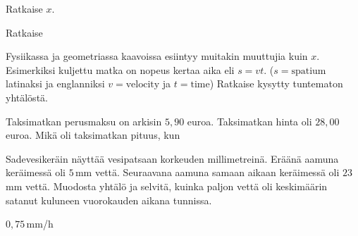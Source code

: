 \begin{tehtavasivu}
\begin{tehtava}
Ratkaise $x$.
	\begin{vastaus}
	\end{vastaus}
\end{tehtava}

\begin{tehtava}
Ratkaise
	\begin{vastaus}
	\end{vastaus}
\end{tehtava}

\begin{tehtava}
Fysiikassa ja geometriassa kaavoissa esiintyy muitakin muuttujia kuin $x$. Esimerkiksi kuljettu matka on nopeus kertaa aika eli $s=vt$. ($s= \text{spatium}$ latinaksi ja englanniksi $v= \text{velocity}$ ja $t= \text{time}$) Ratkaise kysytty tuntematon yhtälöstä.

	\begin{vastaus}
	\end{vastaus}
\end{tehtava}

\begin{tehtava}
Taksimatkan perusmaksu on arkisin $5,90$ euroa. Taksimatkan hinta oli $28,00$ euroa. Mikä oli taksimatkan pituus, kun
	\begin{vastaus}
		\alakohdat{
			§ $14,5$ kilometriä
			§ $10,4$ kilometriä
		}
	\end{vastaus}
\end{tehtava}

\begin{tehtava}
Sadevesikeräin näyttää vesipatsaan korkeuden millimetreinä. Eräänä aamuna keräimessä oli $5$\,mm vettä. Seuraavana aamuna samaan aikaan keräimessä oli $23$\,mm vettä. Muodosta yhtälö ja selvitä, kuinka paljon vettä oli keskimäärin satanut kuluneen vuorokauden aikana tunnissa.
	\begin{vastaus}
	$0,75$\,mm/h
	\end{vastaus}
\end{tehtava}


\end{tehtavasivu}
